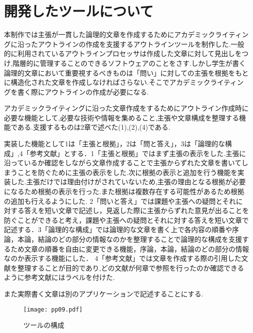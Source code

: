 \documentclass[twocolumn,10pt,a4j]{jsarticle}
\begin{document}
\section{開発したツールについて}
本制作では主張が一貫した論理的文章を作成するためにアカデミックライティングに沿ったアウトラインの作成を支援するアウトラインツールを制作した.一般的に利用されているアウトラインプロセッサは作成した文章に対して見出しをつけ,階層的に管理することのできるソフトウェアのことをさす.しかし学生が書く論理的文章において重要視するべきものは「問い」に対しての主張を根拠をもとに構造化された文章を作成しなければさらない.そこでアカデミックライティングを書く際にアウトラインの作成が必要になる.

アカデミックライティングに沿った文章作成をするためにアウトライン作成時に必要な機能として,必要な技術や情報を集めること,主張や文章構成を整理する機能である.支援するものは2章で述べた(1),(2),(4)である.


実装した機能として\textcircled{\scriptsize{1}}は「主張と根拠」，\textcircled{\scriptsize{2}}は「問と答え」，\textcircled{\scriptsize{3}}は「論理的な構成」,\textcircled{\scriptsize{4}}「参考文献」とする．\textcircled{\scriptsize{1}}「主張と根拠」ではまず主張の表示をした.主張に沿っているか確認をしながら文章作成することで主張からずれた文章を書いてしまうことを防ぐために主張の表示をした.次に根拠の表示と追加を行う機能を実装した.主張だけでは理由付けがされていないため,主張の理由となる根拠が必要になるため根拠の表示を行った.また根拠は複数存在する可能性があるため根拠の追加も行えるようにした.
\textcircled{\scriptsize{2}}「問いと答え」では課題や主張への疑問とそれに対する答えを短い文章で記述し，見返した際に主張からずれた意見が出ることを防ぐことができると考え，課題や主張への疑問とそれに対する答えを短い文章で記述する．\textcircled{\scriptsize{3}}「論理的な構成」では論理的な文章を書く上で各内容の順番や序論，本論，結論のどの部分の情報なのかを整理することで論理的な構成を支援するため文章の順番を自由に変更できる機能，序論，本論，結論のどの部分の情報なのか表示する機能にした．
\textcircled{\scriptsize{4}}「参考文献」では文章を作成する際の引用した文献を整理することが目的であり,どの文献が何章で参照を行ったのか確認できるように参考文献にはラベルを付けた.

また実際書く文章は別のアプリケーションで記述することにする.


\begin{figure}[h]
\begin{center}
 \texttt{[image: pp09.pdf]}
\end{center}
 \caption{ツールの構成}
 \label{fig:教科書}
\end{figure}
\end{document}
